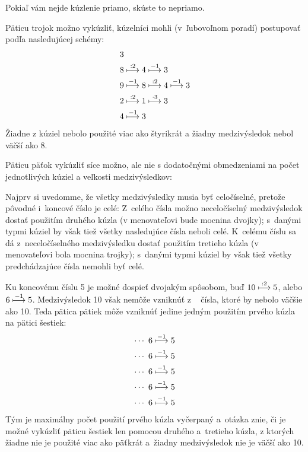{%
\napad
Pokiaľ vám nejde kúzlenie priamo, skúste to nepriamo.

\riesenie
Päticu trojok možno vykúzliť, kúzelníci mohli (v~ľubovoľnom poradí) postupovať podľa nasledujúcej schémy:
$$\aligned
& 3 \\
& 8 \buildrel :2 \over \longmapsto 4 \buildrel -1 \over \longmapsto 3 \\
& 9 \buildrel -1 \over \longmapsto 8 \buildrel :2 \over \longmapsto 4 \buildrel -1 \over \longmapsto 3 \\
& 2 \buildrel :2 \over \longmapsto 1 \buildrel \cdot3 \over \longmapsto 3 \\
& 4 \buildrel -1 \over \longmapsto 3
\endaligned
$$
Žiadne z kúziel nebolo použité viac ako štyrikrát a žiadny medzivýsledok nebol väčší ako 8.

\medskip
Päticu päťok vykúzliť síce možno, ale nie s dodatočnými obmedzeniami na počet jednotlivých kúziel a veľkosti medzivýsledkov:

Najprv si uvedomme, že všetky medzivýsledky musia byť celočíselné, pretože pôvodné i~koncové číslo je celé:
Z~celého čísla možno neceločíselný medzivýsledok dostať použitím druhého kúzla (v menovateľovi bude mocnina dvojky); s~danými typmi kúziel by však tiež všetky nasledujúce čísla neboli celé.
K~celému číslu sa dá z~neceločíselného medzivýsledku dostať použitím tretieho kúzla (v menovateľovi bola mocnina trojky); s~danými typmi kúziel by však tiež všetky predchádzajúce čísla nemohli byť celé.

Ku koncovému číslu 5 je možné dospieť dvojakým spôsobom, buď $10 \buildrel :2 \over \longmapsto 5$, alebo $6 \buildrel -1 \over \longmapsto 5$.
Medzivýsledok 10 však nemôže vzniknúť z ~ čísla, ktoré by nebolo väčšie ako 10.
Teda pätica pätiek môže vzniknúť jedine jedným použitím prvého kúzla na pätici šestiek:
$$\aligned
\cdots\ 6 \buildrel -1 \over \longmapsto 5 \\
\cdots\ 6 \buildrel -1 \over \longmapsto 5 \\
\cdots\ 6 \buildrel -1 \over \longmapsto 5 \\
\cdots\ 6 \buildrel -1 \over \longmapsto 5 \\
\cdots\ 6 \buildrel -1 \over \longmapsto 5 \\
\endaligned
$$
Tým je maximálny počet použití prvého kúzla vyčerpaný a~otázka znie, či je možné vykúzliť päticu šestiek len pomocou druhého a~tretieho kúzla, z ktorých žiadne nie je použité viac ako päťkrát a~žiadny medzivýsledok nie je väčší ako 10.

}
